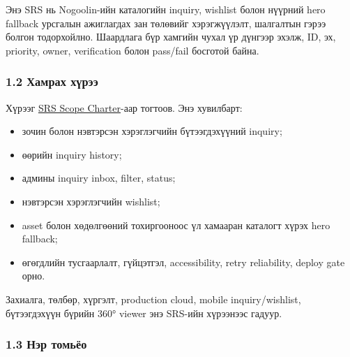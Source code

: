 \documentclass[
  mongolian,
]{article}
\providecommand{\tightlist}{%
  \setlength{\itemsep}{0pt}\setlength{\parskip}{0pt}}
\begin{document}
Энэ SRS нь Nogoolin-ийн каталогийн inquiry, wishlist болон нүүрний hero
fallback урсгалын ажиглагдах зан төлөвийг хэрэгжүүлэлт, шалгалтын гэрээ
болгон тодорхойлно. Шаардлага бүр хамгийн чухал үр дүнгээр эхэлж, ID,
эх, priority, owner, verification болон pass/fail босготой байна.

\subsubsection{1.2 Хамрах
хүрээ}\label{ux445ux430ux43cux440ux430ux445-ux445ux4afux440ux44dux44d}

Хүрээг \href{scope-charter.md}{SRS Scope Charter}-аар тогтоов. Энэ
хувилбарт:

\begin{itemize}
\tightlist
\item
  зочин болон нэвтэрсэн хэрэглэгчийн бүтээгдэхүүний inquiry;
\item
  өөрийн inquiry history;
\item
  админы inquiry inbox, filter, status;
\item
  нэвтэрсэн хэрэглэгчийн wishlist;
\item
  asset болон хөдөлгөөний тохиргооноос үл хамааран каталогт хүрэх hero
  fallback;
\item
  өгөгдлийн тусгаарлалт, гүйцэтгэл, accessibility, retry reliability,
  deploy gate орно.
\end{itemize}

Захиалга, төлбөр, хүргэлт, production cloud, mobile inquiry/wishlist,
бүтээгдэхүүн бүрийн 360° viewer энэ SRS-ийн хүрээнээс гадуур.

\subsubsection{1.3 Нэр
томьёо}\label{ux43dux44dux440-ux442ux43eux43cux44cux451ux43e}
\end{document}

